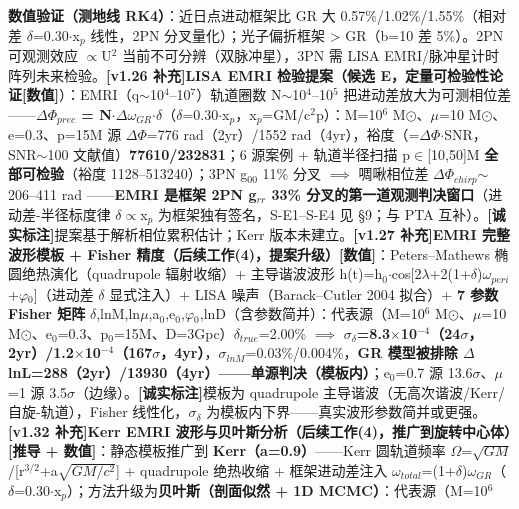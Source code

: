 \documentclass[12pt]{article}
\newcommand{\mtag}[1]{\textbf{[#1]}}
\newcommand{\up}[1]{\ensuremath{^{#1}}}
\newcommand{\down}[1]{\ensuremath{_{#1}}}
\begin{document}
\textbf{数值验证（测地线 RK4）}：近日点进动框架比 GR 大 0.57\%/1.02\%/1.55\%（相对差 \ensuremath{\delta}=0.30\ensuremath{\cdot}x\down{p} 线性，2PN 分叉量化）；光子偏折框架 > GR（b=10 差 5\%）。2PN 可观测效应 \ensuremath{\propto}U\up{2} 当前不可分辨（双脉冲星），3PN 需 LISA EMRI/脉冲星计时阵列未来检验。\textbf{\mtag{v1.26 补充}LISA EMRI 检验提案（候选 E，定量可检验性论证}\mtag{数值}）：EMRI（q\ensuremath{\sim}10\up{4}--10\up{7}）轨道圈数 N\ensuremath{\sim}10\up{4}--10\up{5} 把进动差放大为可测相位差------\textbf{\ensuremath{\Delta}\ensuremath{\Phi}\down{prec} = N\ensuremath{\cdot}\ensuremath{\Delta}\ensuremath{\omega}\down{GR}\ensuremath{\cdot}\ensuremath{\delta}}（\ensuremath{\delta}=0.30\ensuremath{\cdot}x\down{p}，x\down{p}=GM/c\up{2}p）：M=10\up{6} M\ensuremath{\odot}、\ensuremath{\mu}=10 M\ensuremath{\odot}、e=0.3、p=15M 源 \ensuremath{\Delta}\ensuremath{\Phi}=776 rad（2yr）/1552 rad（4yr），裕度（=\ensuremath{\Delta}\ensuremath{\Phi}\ensuremath{\cdot}SNR，SNR\ensuremath{\sim}100 文献值）\textbf{77610/232831}；6 源案例 + 轨道半径扫描 p\ensuremath{\in}[10,50]M \textbf{全部可检验}（裕度 1128--513240）；3PN g\down{00} 11\% 分叉 \ensuremath{\implies} 啁啾相位差 \ensuremath{\Delta}\ensuremath{\Phi}\down{chirp}\ensuremath{\sim}206--411 rad \checkmark------\textbf{EMRI 是框架 2PN g\down{rr} 33\% 分叉的第一道观测判决窗口}（进动差-半径标度律 \ensuremath{\delta}\ensuremath{\propto}x\down{p} 为框架独有签名，S-E1--S-E4 见 \S{}9；与 PTA 互补）。\mtag{诚实标注}提案基于解析相位累积估计；Kerr 版本未建立。\textbf{\mtag{v1.27 补充}EMRI 完整波形模板 + Fisher 精度（后续工作(4)，提案升级）}\mtag{数值}：Peters--Mathews 椭圆绝热演化（quadrupole 辐射收缩）+ 主导谐波波形 h(t)=h\down{0}\ensuremath{\cdot}cos[2\ensuremath{\lambda}+2(1+\ensuremath{\delta})\ensuremath{\omega}\down{peri}+\ensuremath{\varphi}\down{0}]（进动差 \ensuremath{\delta} 显式注入）+ LISA 噪声（Barack--Cutler 2004 拟合）+ \textbf{7 参数 Fisher 矩阵} {\ensuremath{\delta},lnM,ln\ensuremath{\mu},a\down{0},e\down{0},\ensuremath{\varphi}\down{0},lnD}（含参数简并）：代表源（M=10\up{6} M\ensuremath{\odot}、\ensuremath{\mu}=10 M\ensuremath{\odot}、e\down{0}=0.3、p\down{0}=15M、D=3Gpc）\ensuremath{\delta}\down{true}=2.00\% \ensuremath{\implies} \textbf{\ensuremath{\sigma}\down{\delta{}}=8.3\ensuremath{\times}10\up{-4}（24\ensuremath{\sigma}，2yr）/1.2\ensuremath{\times}10\up{-4}（167\ensuremath{\sigma}，4yr）}，\ensuremath{\sigma}\down{lnM}=0.03\%/0.004\%，\textbf{GR 模型被排除 \ensuremath{\Delta}lnL=288（2yr）/13930（4yr）------单源判决（模板内）}；e\down{0}=0.7 源 13.6\ensuremath{\sigma}、\ensuremath{\mu}=1 源 3.5\ensuremath{\sigma}（边缘）。\mtag{诚实标注}模板为 quadrupole 主导谐波（无高次谐波/Kerr/自旋-轨道），Fisher 线性化，\ensuremath{\sigma}\down{\delta{}} 为模板内下界------真实波形参数简并或更强。\textbf{\mtag{v1.32 补充}Kerr EMRI 波形与贝叶斯分析（后续工作(4)，推广到旋转中心体）}\mtag{推导 + 数值}：静态模板推广到 \textbf{Kerr（a=0.9）}------Kerr 圆轨道频率 \ensuremath{\Omega}=\ensuremath{\sqrt{GM}}/[r\up{3/2}+a\ensuremath{\sqrt{GM/c\up{2}}}] + quadrupole 绝热收缩 + 框架进动差注入 \ensuremath{\omega}\down{total}=(1+\ensuremath{\delta})\ensuremath{\omega}\down{GR}（\ensuremath{\delta}=0.30\ensuremath{\cdot}x\down{p}）；方法升级为\textbf{贝叶斯（剖面似然 + 1D MCMC）}：代表源（M=10\up{6} 
\end{document}
